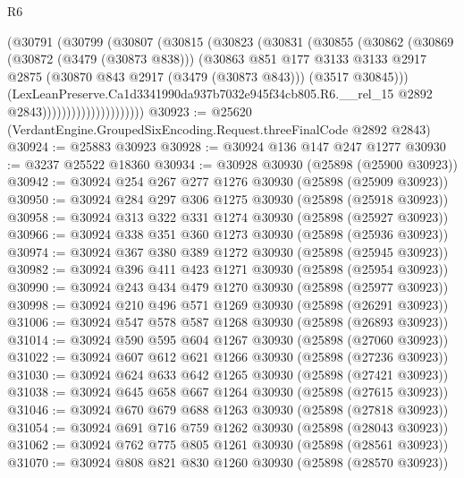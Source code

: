 \begin{lexlean}{R6}
\begin{coremodule}
                            (@30791
                              (@30799
                                (@30807
                                  (@30815
                                    (@30823
                                      (@30831
                                        (@30855
                                          (@30862
                                            (@30869
                                              (@30872 (@3479 (@30873 @838)))
                                              (@30863
                                                @851
                                                @177
                                                @3133
                                                @3133
                                                @2917
                                                @2875
                                                (@30870 @843 @2917 (@3479 (@30873 @843)))
                                                (@3517 @30845)))
                                            (LexLeanPreserve.Ca1d3341990da937b7032e945f34cb805.R6.__rel_15
                                              @2892
                                              @2843)))))))))))))))))))))
@30923 := @25620 (VerdantEngine.GroupedSixEncoding.Request.threeFinalCode @2892 @2843)
@30924 := @25883 @30923
@30928 := @30924 @136 @147 @247 @1277
@30930 := @3237 @25522 @18360
@30934 := @30928 @30930 (@25898 (@25900 @30923))
@30942 := @30924 @254 @267 @277 @1276 @30930 (@25898 (@25909 @30923))
@30950 := @30924 @284 @297 @306 @1275 @30930 (@25898 (@25918 @30923))
@30958 := @30924 @313 @322 @331 @1274 @30930 (@25898 (@25927 @30923))
@30966 := @30924 @338 @351 @360 @1273 @30930 (@25898 (@25936 @30923))
@30974 := @30924 @367 @380 @389 @1272 @30930 (@25898 (@25945 @30923))
@30982 := @30924 @396 @411 @423 @1271 @30930 (@25898 (@25954 @30923))
@30990 := @30924 @243 @434 @479 @1270 @30930 (@25898 (@25977 @30923))
@30998 := @30924 @210 @496 @571 @1269 @30930 (@25898 (@26291 @30923))
@31006 := @30924 @547 @578 @587 @1268 @30930 (@25898 (@26893 @30923))
@31014 := @30924 @590 @595 @604 @1267 @30930 (@25898 (@27060 @30923))
@31022 := @30924 @607 @612 @621 @1266 @30930 (@25898 (@27236 @30923))
@31030 := @30924 @624 @633 @642 @1265 @30930 (@25898 (@27421 @30923))
@31038 := @30924 @645 @658 @667 @1264 @30930 (@25898 (@27615 @30923))
@31046 := @30924 @670 @679 @688 @1263 @30930 (@25898 (@27818 @30923))
@31054 := @30924 @691 @716 @759 @1262 @30930 (@25898 (@28043 @30923))
@31062 := @30924 @762 @775 @805 @1261 @30930 (@25898 (@28561 @30923))
@31070 := @30924 @808 @821 @830 @1260 @30930 (@25898 (@28570 @30923))

\end{coremodule}
\end{lexlean}
